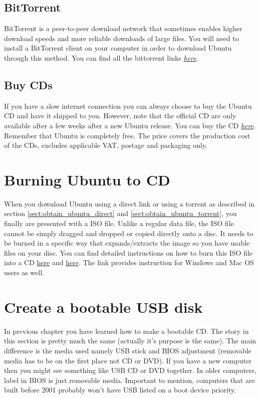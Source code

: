 \subsection*{BitTorrent} \label{sect:obtain_ubuntu_torrent} 
BitTorrent is a peer-to-peer download network that sometimes enables higher download speeds and more reliable downloads of large files. You will need to install a BitTorrent client on your computer in order to download Ubuntu through this method. You can find all the bittorrent links \href{http://www.ubuntu.com/download/ubuntu/alternative-download}{\textit{here}}.

\subsection*{Buy CDs} \label{sect:obtain_ubuntu_buycd} 
If you have a slow internet connection you can always choose to buy the Ubuntu CD and have it shipped to you. However, note that the official CD are only available after a few weeks after a new Ubuntu release. You can buy the CD \href{http://www.ubuntu.com/download/ubuntu/cds}{\textit{here}}. Remember that Ubuntu is completely free. The price covers the production cost of the CDs, excludes applicable VAT, postage and packaging only.

\section{Burning Ubuntu to CD} 
When you download Ubuntu using a direct link or using a torrent as described in section \ref{sect:obtain_ubuntu_direct} and \ref{sect:obtain_ubuntu_torrent}, you finally are presented with a ISO file. Unlike a regular data file, the ISO file cannot be simply dragged and dropped or copied directly onto a disc. It needs to be burned in a specific way that expands/extracts the image so you have usable files on your disc. You can find detailed instructions on how to burn this ISO file into a CD \href{https://help.ubuntu.com/community/BurningIsoHowto}{here} and \href{http://www.ubuntu.com/download/ubuntu/download}{here}. The link provides instruction for Windows and Mac OS users as well.

\section{Create a bootable USB disk} 
In previous chapter you have learned how to make a bootable CD. The story in this section is pretty much the same (actually it's purpose is the same).  The main difference is the media used namely USB stick and BIOS adjustment (removable media has to be on the first place not CD or DVD). If you have a new computer then you might see something like USB CD or DVD  together. In older computers, label in BIOS  is just removable media.  Important to mention, computers that are built before 2001 probably won't have USB listed on a boot device priority. \\

